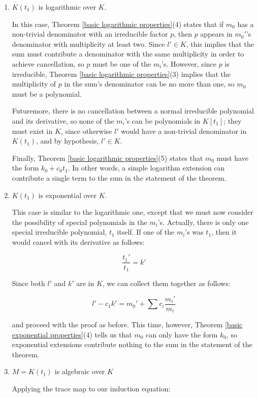 \begin{enumerate}

\item $K(t_1)$ is logarithmic over $K$.

In this case, Theorem \ref{basic logarithmic properties}(4) states
that if $m_0$ has a non-trivial denominator with an irreducible factor
$p$, then $p$ appears in $m_0'$'s denominator with multiplicity at
least two.  Since $l' \in K$, this implies that the sum must
contribute a denominator with the same multiplicity in order to
achieve cancellation, so $p$ must be one of the $m_i$'s.  However,
since $p$ is irreducible, Theorem \ref{basic logarithmic
properties}(3) implies that the multiplicity of $p$ in the sum's
denominator can be no more than one, so $m_0$ must be a polynomial.

Futuremore, there is no cancellation between a normal irreducible
polynomial and its derivative, so none of the $m_i$'s can be
polynomials in $K[t_1]$; they must exist in $K$, since otherwise
$l'$ would have a non-trivial denominator in $K(t_1)$,
and by hypothesis, $l' \in K$.

Finally, Theorem \ref{basic logarithmic properties}(5) states
that $m_0$ must have the form $k_0 + c_0 t_1$.  In other
words, a simple logarithm extension can contribute a single
term to the sum in the statement of the theorem.

\item $K(t_1)$ is exponential over $K$.

This case is similar to the logarithmic one, except that we must now
consider the possibility of special polynomials in the $m_i$'s.
Actually, there is only one special irreducible polynomial, $t_1$
itself.  If one of the $m_i$'s was $t_1$, then it would cancel
with its derivative as follows:

$$\frac{t_1'}{t_1} = k'$$

Since both $l'$ and $k'$ are in $K$, we can collect them together as follows:

$$l' - c_1 k' = m_0' + \sum c_i \frac{m_i'}{m_i}$$

and proceed with the proof as before.  This time, however,
Theorem \ref{basic exponential properties}(4) tells us that
$m_0$ can only have the form $k_0$, so exponential
extensions contribute nothing to the sum in the statement
of the theorem.

\item $M = K(t_1)$ is algebraic over $K$

Applying the trace map to our induction equation:


\end{enumerate}
